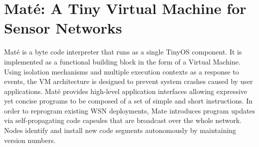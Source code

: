 \section{Maté: A Tiny Virtual Machine for Sensor Networks}
Maté is a byte code interpreter that runs as a single TinyOS component. It is implemented as a functional building block in the form of a Virtual Machine. Using isolation mechanisms and multiple execution contexts as a response to events, the VM architecture is designed to prevent system crashes caused by user applications. Maté provides high-level application interfaces allowing expressive yet concise programs to be composed of a set of simple and short instructions. In order to reprogram existing WSN deployments, Mate introduces program updates via self-propagating code capsules that are broadcast over the whole network. Nodes identify and install new code segments autonomously by maintaining version numbers. 